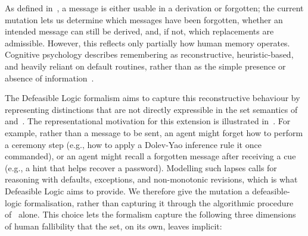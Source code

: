 As defined in~, a message is either usable in a derivation or forgotten; the current  \forget{} mutation lets us determine which messages have been forgotten, whether an intended message can still be derived, and, if not, which replacements are admissible. However, this reflects only partially how human memory operates. Cognitive psychology describes remembering as reconstructive, heuristic-based, and heavily reliant on default routines, rather than as the simple presence or absence of information~\cite{bartlett1995remembering}.

The Defeasible Logic formalism aims to capture this reconstructive behaviour by representing distinctions that are not directly expressible in the \Forget{} set semantics of~ and~. The representational motivation for this extension is illustrated in~. For example, rather than a message to be sent, an agent might forget how to perform a ceremony step (e.g., how to apply a Dolev-Yao inference rule it once commanded), or an agent might recall a forgotten message after receiving a cue (e.g., a hint that helps recover a password). Modelling such lapses calls for reasoning with defaults, exceptions, and non-monotonic revisions, which is what Defeasible Logic aims to provide.
We therefore give the \forget{} mutation a defeasible-logic formalisation, rather than capturing it through the algorithmic procedure of~ alone. This choice lets the formalism capture the following three dimensions of human fallibility that the \Forget{} set, on its own, leaves implicit:
